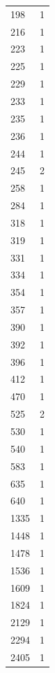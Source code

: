 \documentclass[12pt]{article}
\begin{document}
\begin{itemize}
\begin{center}
\begin{longtable}{|l|l|}
        198      & 1      \\
        216      & 1      \\
        223      & 1      \\
        225      & 1      \\
        229      & 1      \\
        233      & 1      \\
        235      & 1      \\
        236      & 1      \\
        244      & 1      \\
        245      & 2      \\
        258      & 1      \\
        284      & 1      \\
        318      & 1      \\
        319      & 1      \\
        331      & 1      \\
        334      & 1      \\
        354      & 1      \\
        357      & 1      \\
        390      & 1      \\
        392      & 1      \\
        396      & 1      \\
        412      & 1      \\
        470      & 1      \\
        525      & 2      \\
        530      & 1      \\
        540      & 1      \\
        583      & 1      \\
        635      & 1      \\
        640      & 1      \\
        1335     & 1      \\
        1448     & 1      \\
        1478     & 1      \\
        1536     & 1      \\
        1609     & 1      \\
        1824     & 1      \\
        2129     & 1      \\
        2294     & 1      \\
        2405     & 1      \\

\end{longtable}
\end{center}
\end{itemize}
\end{document}
